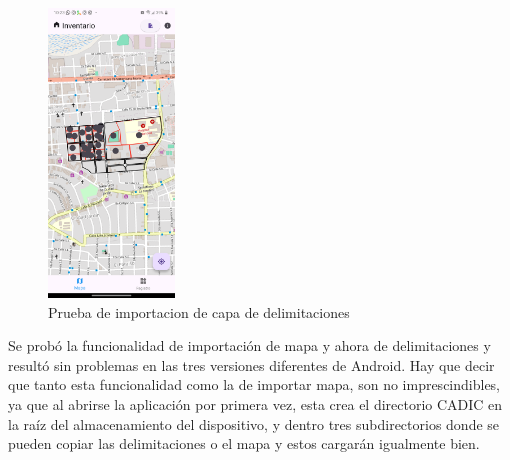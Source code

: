 \begin{figure}[h]
    \includegraphics[width=0.3\textwidth]{Graphics/Capitulo 4/LG Android 13/4.3/1.png}
    \caption{Prueba de importacion de capa de delimitaciones}
    \label{fig:figura21}
\end{figure}
Se probó la funcionalidad de importación de mapa y ahora de delimitaciones y resultó sin problemas en las tres versiones diferentes de Android. Hay que decir que tanto esta funcionalidad
como la de importar mapa, son no imprescindibles, ya que al abrirse la aplicación por primera vez, esta crea el directorio CADIC en la raíz del almacenamiento
del dispositivo, y dentro tres subdirectorios donde se pueden copiar las delimitaciones o el mapa y estos cargarán igualmente bien.

\pagebreak
